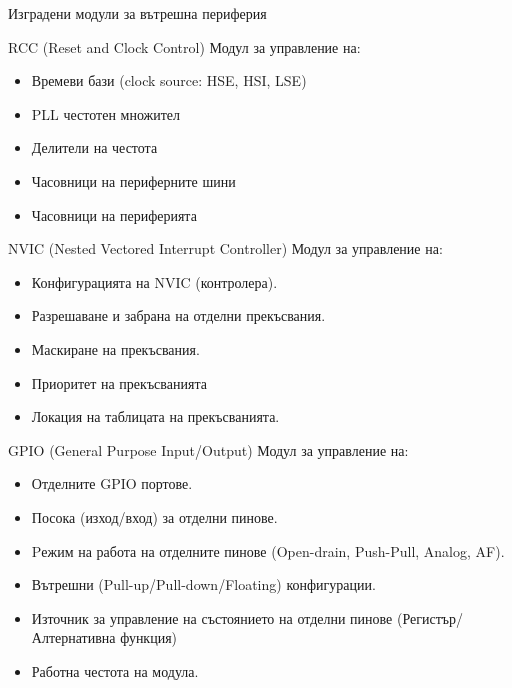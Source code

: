 \documentclass[handout]{beamer}
\begin{document}
\begin{frame}{Изградени модули за вътрешна периферия}
	\begin{block}{RCC (Reset and Clock Control)}
		Модул за управление на:
		\begin{itemize}
			\item Времеви бази (clock source: HSE, HSI, LSE)
			\item PLL честотен множител
			\item Делители на честота
			\item Часовници на периферните шини
			\item Часовници на периферията
		\end{itemize}
	\end{block}

\end{frame}

\begin{frame}[t]

	\begin{block}{NVIC (Nested Vectored Interrupt Controller)}
		Модул за управление на:
		\begin{itemize}
			\item Конфигурацията на NVIC (контролера).
			\item Разрешаване и забрана на отделни прекъсвания.
			\item Маскиране на прекъсвания.
			\item Приоритет на прекъсванията
			\item Локация на таблицата на прекъсванията.
		\end{itemize}
	\end{block}

\end{frame}

\begin{frame}[t]

	\begin{block}{GPIO (General Purpose Input/Output)}
		Модул за управление на:
		 \begin{itemize}
			 \item Отделните GPIO портове.
			 \item Посока (изход/вход) за отделни пинове.
			 \item Pежим на работа на отделните пинове (Open-drain, Push-Pull, Analog, AF).
			 \item Вътрешни (Pull-up/Pull-down/Floating) конфигурации.
			 \item Източник за управление на състоянието на отделни пинове (Регистър/Алтернативна функция)
			 \item Работна честота на модула.
	 	\end{itemize}
	\end{block}

\end{frame}
\end{document}
